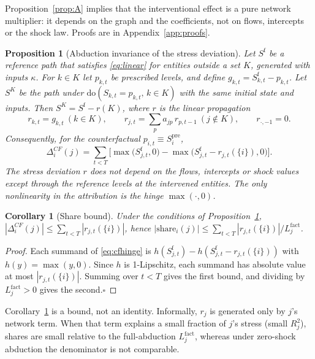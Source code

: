 \documentclass[referee,pdflatex,sn-mathphys-ay]{sn-jnl}
\theoremstyle{thmstyleone}%
\newtheorem{proposition}[theorem]{Proposition}%
\newtheorem{corollary}{Corollary}%
\theoremstyle{thmstyletwo}%
\theoremstyle{thmstylethree}%
\newcommand{\doop}{\mathrm{do}}
\begin{document}
Proposition~\ref{prop:A} implies that the interventional effect is a pure network multiplier: it depends on the graph and the coefficients, not on flows, intercepts or the shock law. Proofs are in Appendix~\ref{app:proofs}.

\begin{proposition}[Abduction invariance of the stress deviation]
\label{prop:B}
Let $S^{\mathrm f}$ be a reference path that satisfies \eqref{eq:linear} for entities
outside a set $K$, generated with inputs $\kappa$. For $k\in K$ let $p_{k,t}$ be
prescribed levels, and define $g_{k,t}=S^{\mathrm f}_{k,t}-p_{k,t}$. Let $S^{K}$ be the path
under $\doop(S_{k,t}=p_{k,t},\,k\in K)$ with the same initial state and inputs. Then
$S^{K}=S^{\mathrm f}-r(K)$, where $r$ is the linear propagation
\begin{equation}
\label{eq:propagate}
r_{k,t}=g_{k,t}\ (k\in K),\qquad r_{j,t}=\sum_{p}a_{jp}\,r_{p,t-1}\ (j\notin K),
\qquad r_{\cdot,-1}=0.
\end{equation}
Consequently, for the counterfactual $p_{i,t}\equiv S_i^{\mathrm{pre}}$,
\begin{equation}
\label{eq:cfhinge}
\Delta_i^{CF}(j)=\sum_{t<T}\Big[\max\big(S^{\mathrm f}_{j,t},0\big)-\max\big(S^{\mathrm f}_{j,t}-r_{j,t}(\{i\}),0\big)\Big].
\end{equation}
The stress deviation $r$ does not depend on the flows, intercepts or shock values except
through the reference levels at the intervened entities. The only nonlinearity in the
attribution is the hinge $\max(\cdot,0)$.
\end{proposition}

\begin{corollary}[Share bound]
\label{cor:share}
Under the conditions of Proposition~\ref{prop:B}, $|\Delta_i^{CF}(j)|\le\sum_{t<T}|r_{j,t}(\{i\})|$, hence
$|\mathrm{share}_i(j)|\le \sum_{t<T}|r_{j,t}(\{i\})|/L_j^{\mathrm{fact}}$.
\end{corollary}
\begin{proof}
Each summand of \eqref{eq:cfhinge} is $h(S^{\mathrm f}_{j,t})-h(S^{\mathrm f}_{j,t}-r_{j,t}(\{i\}))$ with $h(y)=\max(y,0)$.
Since $h$ is 1-Lipschitz, each summand has absolute value at most $|r_{j,t}(\{i\})|$. Summing over $t<T$
gives the first bound, and dividing by $L_j^{\mathrm{fact}}>0$ gives the second.\hfill$\square$
\end{proof}

Corollary~\ref{cor:share} is a bound, not an identity. Informally, $r_j$ is generated only by $j$'s
network term. When that term explains a small fraction of $j$'s stress (small $R^2_j$), shares are small
relative to the full-abduction $L_j^{\mathrm{fact}}$, whereas under zero-shock abduction the
denominator is not comparable.
\end{document}
